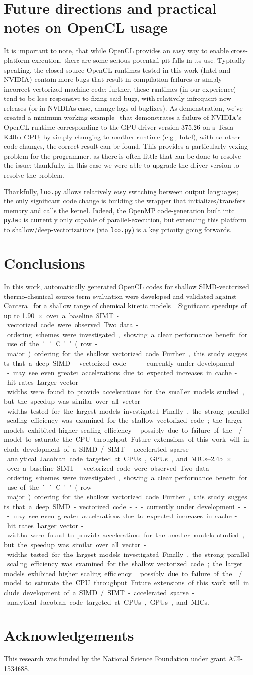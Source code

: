 \documentclass[12pt,number,sort&compress,preprint]{elsarticle}
\begin{document}
\section{Future directions and practical notes on OpenCL usage}
\label{s:future}
It is important to note, that while OpenCL provides an easy way to enable cross-platform execution, there are some serious potential pit-falls in its use.
Typically speaking, the closed source OpenCL runtimes tested in this work (Intel and NVIDIA) contain more bugs that result in compilation failures or simply incorrect vectorized machine code; further, these runtimes (in our experience) tend to be less responsive to fixing said bugs, with relatively infrequent new releases (or in NVIDIAs case, change-logs of bugfixes).
As demonstration, we've created a minimum working example~\cite{nvidia_mwe} that demonstrates a failure of NVIDIA's OpenCL runtime corresponding to the GPU driver version \num{375.26} on a Tesla K40m GPU; by simply changing to another runtime (e.g., Intel), with no other code changes, the correct result can be found.
This provides a particularly vexing problem for the programmer, as there is often little that can be done to resolve the issue; thankfully, in this case we were able to upgrade the driver version to resolve the problem.

Thankfully, \texttt{loo.py} allows relatively easy switching between output languages; the only significant code change is building the wrapper that initializes\slash transfers memory and calls the kernel.
Indeed, the OpenMP code-generation built into \texttt{pyJac} is currently only capable of parallel-execution, but extending this platform to shallow\slash deep-vectorizations (via \texttt{loo.py}) is a key priority going forwards.


\section{Conclusions}
In this work, automatically generated OpenCL codes for shallow SIMD-vectorized thermo-chemical source term evaluation were developed and validated against Cantera~\cite{Cantera} for a shallow range of chemical kinetic models~\cite{Burke:2011fh,smith_gri-mech_30,Wang:2007,Sarathy:2013jr}.
Significant speedups of up to \SIrange{1.90}{2.45}{$\times$} over a baseline SIMT-vectorized code were observed.
Two data-ordering schemes were investigated, showing a clear performance benefit for use of the ``C'' (row-major) ordering for the shallow vectorized code.
Further, this study suggests that a deep SIMD-vectorized code---currently under development---may see even greater accelerations due to expected increases in cache-hit rates.
Larger vector-widths were found to provide accelerations for the smaller models studied, but the speedup was similar over all vector-widths tested for the largest models investigated.
Finally, the strong parallel scaling efficiency was examined for the shallow vectorized code; the larger models exhibited higher scaling efficiency, possibly due to failure of the \slash{} model to saturate the CPU throughput.
Future extensions of this work will include development of a SIMD\slash SIMT-accelerated sparse-analytical Jacobian code targeted at CPUs, GPUs, and MICs.

\section{Acknowledgements}
This research was funded by the National Science Foundation under grant ACI-1534688.


\end{document}
